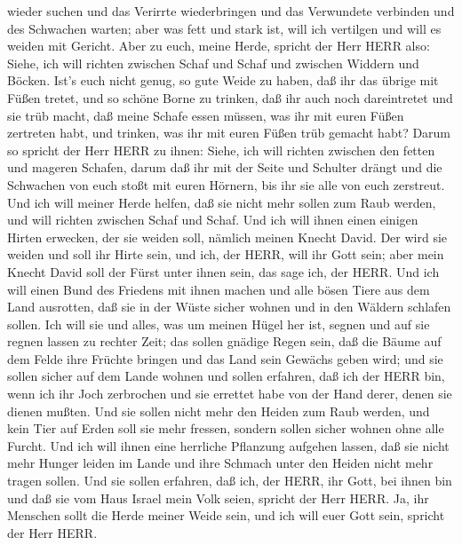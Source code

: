 wieder suchen und das Verirrte wiederbringen und das Verwundete
verbinden und des Schwachen warten; aber was fett und stark ist, will
ich vertilgen und will es weiden mit Gericht.  Aber zu
euch, meine Herde, spricht der Herr HERR also: Siehe, ich will richten
zwischen Schaf und Schaf und zwischen Widdern und Böcken. 
Ist's euch nicht genug, so gute Weide zu haben, daß ihr das übrige mit
Füßen tretet, und so schöne Borne zu trinken, daß ihr auch noch
dareintretet und sie trüb macht,  daß meine Schafe essen
müssen, was ihr mit euren Füßen zertreten habt, und trinken, was ihr mit
euren Füßen trüb gemacht habt?  Darum so spricht der Herr
HERR zu ihnen: Siehe, ich will richten zwischen den fetten und mageren
Schafen,  darum daß ihr mit der Seite und Schulter drängt
und die Schwachen von euch stoßt mit euren Hörnern, bis ihr sie alle von
euch zerstreut.  Und ich will meiner Herde helfen, daß sie
nicht mehr sollen zum Raub werden, und will richten zwischen Schaf und
Schaf.  Und ich will ihnen einen einigen Hirten erwecken,
der sie weiden soll, nämlich meinen Knecht David. Der wird sie weiden
und soll ihr Hirte sein,  und ich, der HERR, will ihr Gott
sein; aber mein Knecht David soll der Fürst unter ihnen sein, das sage
ich, der HERR.  Und ich will einen Bund des Friedens mit
ihnen machen und alle bösen Tiere aus dem Land ausrotten, daß sie in der
Wüste sicher wohnen und in den Wäldern schlafen sollen. 
Ich will sie und alles, was um meinen Hügel her ist, segnen und auf sie
regnen lassen zu rechter Zeit; das sollen gnädige Regen sein,
 daß die Bäume auf dem Felde ihre Früchte bringen und das
Land sein Gewächs geben wird; und sie sollen sicher auf dem Lande wohnen
und sollen erfahren, daß ich der HERR bin, wenn ich ihr Joch zerbrochen
und sie errettet habe von der Hand derer, denen sie dienen mußten.
 Und sie sollen nicht mehr den Heiden zum Raub werden, und
kein Tier auf Erden soll sie mehr fressen, sondern sollen sicher wohnen
ohne alle Furcht.  Und ich will ihnen eine herrliche
Pflanzung aufgehen lassen, daß sie nicht mehr Hunger leiden im Lande und
ihre Schmach unter den Heiden nicht mehr tragen sollen. 
Und sie sollen erfahren, daß ich, der HERR, ihr Gott, bei ihnen bin und
daß sie vom Haus Israel mein Volk seien, spricht der Herr HERR.
 Ja, ihr Menschen sollt die Herde meiner Weide sein, und
ich will euer Gott sein, spricht der Herr HERR.

